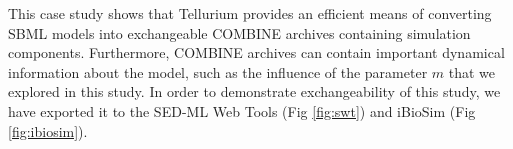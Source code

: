 \documentclass[10pt,letterpaper]{article}
\begin{document}
This case study shows that Tellurium provides an efficient means of converting SBML models into exchangeable COMBINE archives containing simulation components. Furthermore, COMBINE archives can contain important dynamical information about the model, such as the influence of the parameter $m$ that we explored in this study. In order to demonstrate exchangeability of this study, we have exported it to the SED-ML Web Tools \cite{bergmann2017sed} (Fig \ref{fig:swt}) and iBioSim \cite{myers2009ibiosim} (Fig \ref{fig:ibiosim}).

%
%
%
%
\end{document}
